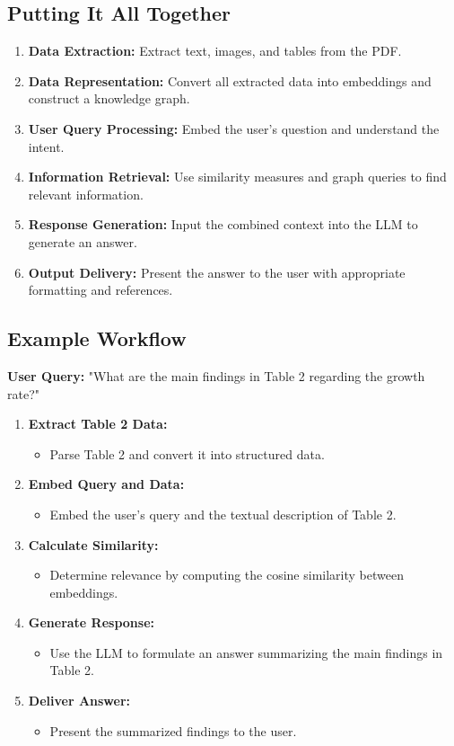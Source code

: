 \documentclass[12pt]{article}
\begin{document}
\subsection{Putting It All Together}

\begin{enumerate}
    \item \textbf{Data Extraction:} Extract text, images, and tables from the PDF.
    \item \textbf{Data Representation:} Convert all extracted data into embeddings and construct a knowledge graph.
    \item \textbf{User Query Processing:} Embed the user's question and understand the intent.
    \item \textbf{Information Retrieval:} Use similarity measures and graph queries to find relevant information.
    \item \textbf{Response Generation:} Input the combined context into the LLM to generate an answer.
    \item \textbf{Output Delivery:} Present the answer to the user with appropriate formatting and references.
\end{enumerate}

\subsection{Example Workflow}

\textbf{User Query:} "What are the main findings in Table 2 regarding the growth rate?"

\begin{enumerate}
    \item \textbf{Extract Table 2 Data:}
    \begin{itemize}
        \item Parse Table 2 and convert it into structured data.
    \end{itemize}
    \item \textbf{Embed Query and Data:}
    \begin{itemize}
        \item Embed the user's query and the textual description of Table 2.
    \end{itemize}
    \item \textbf{Calculate Similarity:}
    \begin{itemize}
        \item Determine relevance by computing the cosine similarity between embeddings.
    \end{itemize}
    \item \textbf{Generate Response:}
    \begin{itemize}
        \item Use the LLM to formulate an answer summarizing the main findings in Table 2.
    \end{itemize}
    \item \textbf{Deliver Answer:}
    \begin{itemize}
        \item Present the summarized findings to the user.
    \end{itemize}
\end{enumerate}
\end{document}
